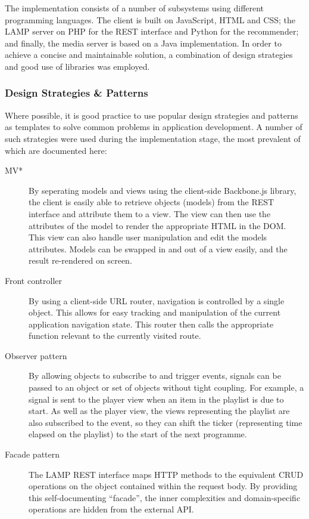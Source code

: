 The implementation consists of a number of subsystems using different programming languages. The client is built on JavaScript, HTML and CSS; the LAMP server on PHP for the REST interface and Python for the recommender; and finally, the media server is based on a Java implementation. In order to achieve a concise and maintainable solution, a combination of design strategies and good use of libraries was employed.

\subsubsection{Design Strategies \& Patterns}

Where possible, it is good practice to use popular design strategies and patterns as templates to solve common problems in application development. A number of such strategies were used during the implementation stage, the most prevalent of which are documented here:

\begin{description}
	\item[MV*] By seperating models and views using the client-side Backbone.js library, the client is easily able to retrieve objects (models) from the REST interface and attribute them to a view. The view can then use the attributes of the model to render the appropriate HTML in the DOM. This view can also handle user manipulation and edit the models attributes. Models can be swapped in and out of a view easily, and the result re-rendered on screen.
	\item[Front controller] By using a client-side URL router, navigation is controlled by a single object. This allows for easy tracking and manipulation of the current application navigation state. This router then calls the appropriate function relevant to the currently visited route.
	\item[Observer pattern] By allowing objects to subscribe to and trigger events, signals can be passed to an object or set of objects without tight coupling. For example, a signal is sent to the player view when an item in the playlist is due to start. As well as the player view, the views representing the playlist are also subscribed to the event, so they can shift the ticker (representing time elapsed on the playlist) to the start of the next programme.
	\item[Facade pattern] The LAMP REST interface maps HTTP methods to the equivalent CRUD operations on the object contained within the request body. By providing this self-documenting ``facade'', the inner complexities and domain-specific operations are hidden from the external API.
\end{description}

